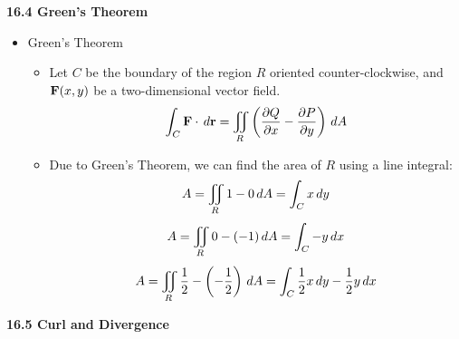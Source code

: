 \newpage

\centerline{\bf 16.4 Green's Theorem}

  \begin{itemize}
    \item Green's Theorem
      \begin{itemize}
        \item Let $C$ be the boundary of the region $R$ oriented counter-clockwise, and $\mathbf{F}(x,y)$ be a two-dimensional vector field.
          \[
            \int_C \mathbf{F}\cdot\,d{\mathbf{r}} = \iint_R \left(\frac{\partial Q}{\partial x}-\frac{\partial P}{\partial y}\right)\,d{A}
          \]
        \item Due to Green's Theorem, we can find the area of $R$ using a line integral:
          \[ 
            A = \iint_R 1 - 0 \,d{A} = \int_C x\,d{y} 
          \]
          \[
            A = \iint_R 0 - (-1)\,d{A} = \int_C -y\,d{x} 
          \]
          \[
            A = \iint_R \frac{1}{2} - \left(-\frac{1}{2}\right) \,d{A} = \int_C \frac{1}{2}x\,d{y}-\frac{1}{2}y\,d{x}
          \]
      \end{itemize}
  \end{itemize}

\newpage

\centerline{\bf 16.5 Curl and Divergence}

